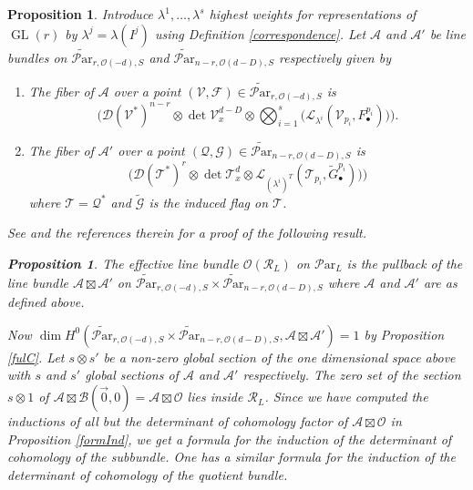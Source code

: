 \documentclass[11pt]{amsart}
\newcommand\op{\operatorname}
\newcommand\bull{{\bullet}}
\newcommand\mf{\mathcal{F}}
\newcommand\mt{\mathcal{T}}
\newcommand\mv{\mathcal{V}}
\newcommand\tensor{\otimes}
\newcommand\ml{\mathcal{L}}
\newcommand\ma{\mathcal{A}}
\newcommand\mg{\mathcal{G}}
\newcommand\mq{\mathcal{Q}}
\newcommand\ParL{\mathcal{P}\text{ar}_L}
\newcommand\Par{\mathcal{P}\text{ar} }
\newtheorem{proposition}[theorem]{Proposition}
\numberwithin{theorem}{subsection}
\begin{document}
{\begin{proposition}
Introduce $\lambda^1,\dots,\lambda^s$ highest weights for representations of $\op{GL}(r)$ by $\lambda^j=\lambda(I^j)$ using Definition  \ref{correspondence}. Let $\ma$ and $\ma'$ be line bundles on $\widetilde{\Par}_{r,\mathcal{O}(-d),S}$ and $\widetilde{\Par}_{n-r,\mathcal{O}(d-D),S}$ respectively given by
\begin{enumerate}
\item The fiber of $\ma$ over a point $(\mv,\mf)\in \widetilde{\Par}_{r,\mathcal{O}(-d),S}$ is
$$\bigl(\mathcal{D}(\mv^*)^{n-r}\tensor \det \mv_x^{d-D}\tensor \bigotimes_{i=1}^s\bigl( \ml_{\lambda^i}(\mv_{p_i},F^{p_i}_{\bull})\bigr)\bigr).$$
\item The fiber of $\ma'$ over a point $(\mq,\mg)\in \widetilde{\Par}_{n-r,\mathcal{O}(d-D),S}$ is
$$\bigl(\mathcal{D}(\mathcal{T}^*)^r\tensor \det \mathcal{T}_x^{d}\otimes \ml_{(\lambda^i)^T}(\mt_{p_i},\widetilde{G}^{p_i}_{\bull})\bigr)\bigr)$$
where $\mathcal{T}=\mq^*$ and $\widetilde{\mg}$ is the induced flag on $\mathcal{T}$.
\end{enumerate}
See \cite[Section 11]{BGM} and the references therein for a proof of the following result.
\begin{proposition}\label{basicC}
The effective line bundle $\mathcal{O}(\mathcal{R}_L)$ on $\ParL$ is the pullback of the line bundle $\ma\boxtimes \ma'$ on $\widetilde{\Par}_{r,\mathcal{O}(-d),S}\times \widetilde{\Par}_{n-r,\mathcal{O}(d-D),S}$ where $\mathcal{A}$ and $\mathcal{A}'$ are as defined above.
\end{proposition}

Now $\dim H^0(\widetilde{\Par}_{r,\mathcal{O}(-d),S}\times \widetilde{\Par}_{n-r,\mathcal{O}(d-D),S},\ma\boxtimes\ma')=1$ by Proposition \ref{fulC}.  Let $s\tensor s'$ be a non-zero global section of the one dimensional space above  with $s$ and $s'$ global sections of  $\ma$ and $\ma'$ respectively. The zero set of the section $s\tensor 1$ of $\mathcal{A}\boxtimes \mathcal{B}(\vec{0},0)=\mathcal{A}\boxtimes \mathcal{O}$ lies inside $\mathcal{R}_L$. Since we have computed the inductions of all but the determinant of cohomology factor of $\ma\boxtimes\mathcal{O}$ in Proposition \ref{formInd}, we get a formula for the induction of the determinant of cohomology of the subbundle. One has a similar formula for the induction of the determinant of cohomology of the quotient bundle.





\end{proposition}}
\end{document}

